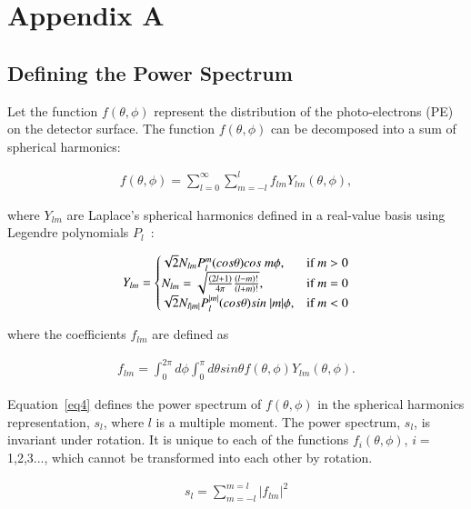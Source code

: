 \section{Appendix A}
\label{Appendix_A}

\subsection{Defining the Power Spectrum}

Let the function $f(\theta,\phi)$ represent the distribution of the
photo-electrons (PE) on the detector surface. The function
$f(\theta,\phi)$ can be decomposed into a sum of spherical harmonics:

\begin{eqnarray}
\label{eq1}
f(\theta,\phi) = \sum_{l=0}^{\infty} \sum_{m=-l}^{l} f_{lm} Y_{lm}(\theta,\phi),
\end{eqnarray}

where $Y_{lm}$ are Laplace's spherical harmonics defined in a
real-value basis using Legendre polynomials $P_l$~\cite{legendre_polynomials}:

\begin{eqnarray}
\label{eq2}
Y_{lm} = \left\{
  \begin{array}{@{}ll@{}}
    \sqrt{2}N_{lm}P_l^m(cos\theta)cos~m\phi, & \text{if}\ m>0 \\
    N_{lm} = \sqrt{\frac{(2l+1)}{4\pi} \frac{(l-m)!}{(l+m)!}}, & \text{if}\ m=0 \\
    \sqrt{2}N_{l|m|}P_l^{|m|}(cos\theta)sin~|m|\phi, & \text{if}\ m<0
  \end{array}\right.
\end{eqnarray}

where the coefficients $f_{lm}$ are defined as
 
\begin{eqnarray}
\label{eq3}
f_{lm} = \int_{0}^{2\pi} d\phi \int_0^{\pi} d\theta sin\theta f(\theta,\phi) Y_{lm}(\theta,\phi).
\end{eqnarray}

Equation~\ref{eq4} defines the power spectrum of $f(\theta,\phi)$ in
the spherical harmonics representation, $s_l$, where $l$ is a multiple
moment. The power spectrum, $s_l$, is invariant under rotation. It is
unique to each of the functions $f_i(\theta,\phi)$, $i=$1,2,3...,
which cannot be transformed into each other by rotation.

\begin{eqnarray}
\label{eq4}
s_l = \sum_{m=-l}^{m=l} |f_{lm}|^2
\end{eqnarray}

